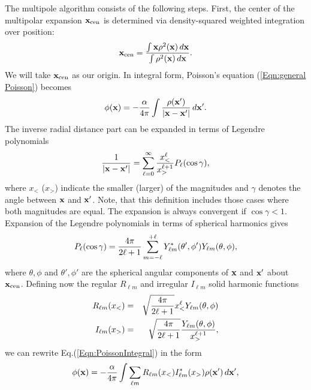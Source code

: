 The multipole algorithm consists of the following steps. First, the center of
the multipolar expansion ${\bf x}_{\rm cen}$ is determined via density-squared weighted
integration over position:
\begin{equation}
{\bf x}_{\rm cen} = {\int {\bf x}\rho^2({\bf x})\,d{\bf x} \over
                    \int \rho^2({\bf x})\,d{\bf x}}.
\end{equation}
We will take ${\bf x}_{\rm cen}$ as our origin.  In integral form, Poisson's
equation (\ref{Eqn:general Poisson}) becomes
\begin{equation}
\label{Eqn:PoissonIntegral}
\phi({\bf x}) = -{\alpha\over 4\pi}\int {\rho({\bf x}')\over
                |{\bf x} - {\bf x}'|}\,d{\bf x}'.
\end{equation}
The inverse radial distance part can be expanded in terms of Legendre
polynomials
\begin{equation}
\label{Eqn:Inverse distance Legendre}
{1\over |{\bf x} - {\bf x}'|} = \sum_{\ell=0}^\infty
{x_<^\ell\over x_>^{\ell+1}}P_\ell (\cos\gamma),
\end{equation}
where $x_<$ ($x_>$) indicate the smaller (larger) of the magnitudes
and $\gamma$ denotes the angle between ${\bf x}$ and ${\bf x}'$. Note, that this
definition includes those cases where both magnitudes are equal. The expansion
is always convergent if $\cos\gamma <1$. Expansion of the Legendre polynomials
in terms of spherical harmonics gives
\begin{equation}
\label{Eqn:Legendre spherical harmonics}
P_\ell (\cos\gamma) = {4\pi\over 2\ell+1}\sum_{m=-\ell}^{+\ell}
Y_{\ell m}^*(\theta',\phi') Y_{\ell m}(\theta,\phi),
\end{equation}
where $\theta,\phi$ and $\theta',\phi'$ are the spherical angular components of
${\bf x}$ and ${\bf x}'$ about ${\bf x}_{\rm cen}$.
Defining now the regular $R_{\ell m}$ and irregular $I_{\ell m}$ solid
harmonic functions
\begin{eqnarray}
R_{\ell m}(x_<) & = & \sqrt{{4\pi\over {2\ell+1}}}x_<^\ell Y_{\ell m}(\theta,\phi) \\
I_{\ell m}(x_>) & = & \sqrt{{4\pi\over {2\ell+1}}}{Y_{\ell m}(\theta,\phi)\over x_>^{\ell+1}},
\end{eqnarray}
we can rewrite Eq.(\ref{Eqn:PoissonIntegral}) in the form
\begin{equation}
\label{Eqn:Poisson solid harmonics}
\phi({\bf x}) = -{\alpha\over 4\pi}
\int \sum_{\ell m}R_{\ell m}(x_<)I_{\ell m}^*(x_>)\rho({\bf x}')\,d{\bf x}',
\end{equation}
